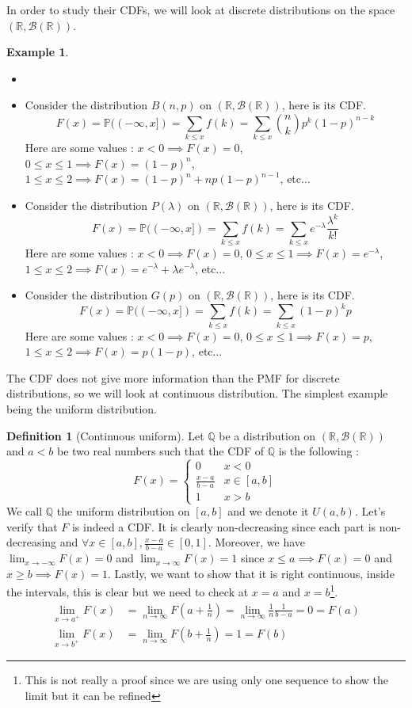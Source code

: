 \documentclass[paper=a4, fontsize=12pt]{scrartcl} %
\theoremstyle{definition}
\newtheorem{defn}[thm]{Definition}
\newtheorem{exmp}[thm]{Example}
\theoremstyle{remark}
\newcommand{\R}{\mathbb{R}}
\newcommand{\Q}{\mathbb{Q}}
\renewcommand{\P}{\mathbb{P}}
\numberwithin{equation}{section} %
\numberwithin{figure}{section} %
\numberwithin{table}{section} %
\begin{document}
In order to study their CDFs, we will look at discrete distributions on the space $(\R, \mathcal{B}(\R))$.
\begin{exmp}
	\begin{itemize}
		\item[]
		\item Consider the distribution $B(n,p)$ on $(\R, \mathcal{B}(\R))$, here is its CDF.
		\[F(x) = \P((-\infty,x]) = \sum_{k\leq x} f(k) = \sum_{k\leq x} \binom{n}{k}p^k(1-p)^{n-k}\]
		Here are some values : $x < 0 \implies F(x) = 0$, $0\leq x \leq 1 \implies F(x) = (1-p)^n$, $1 \leq x \leq 2 \implies F(x) = (1-p)^n + np(1-p)^{n-1}$, etc...
		\item Consider the distribution $P(\lambda)$ on $(\R, \mathcal{B}(\R))$, here is its CDF.
		\[ F(x) = \P((-\infty,x]) = \sum_{k\leq x}f(k) = \sum_{k\leq x} e^{-\lambda}\frac{\lambda^k}{k!}\]
		Here are some values : $x < 0 \implies F(x) = 0$, $0 \leq x \leq 1 \implies F(x) = e^{-\lambda}$, $1 \leq x \leq 2 \implies F(x) = e^{-\lambda} + \lambda e^{-\lambda}$, etc...
		\item Consider the distribution $G(p)$ on $(\R, \mathcal{B}(\R))$, here is its CDF.
		\[F(x) = \P((-\infty,x]) = \sum_{k\leq x}f(k) = \sum_{k\leq x} (1-p)^kp\]
		Here are some values : $x < 0 \implies F(x) = 0$, $0\leq x \leq 1 \implies F(x) = p$, $1 \leq x \leq 2 \implies F(x) = p(1-p)$, etc...
	\end{itemize}
\end{exmp}
The CDF does not give more information than the PMF for discrete distributions, so we will look at continuous distribution. The simplest example being the uniform distribution.
\begin{defn}[Continuous uniform]
	Let $\Q$ be a distribution on $(\R, \mathcal{B}(\R))$ and $a<b$ be two real numbers such that the CDF of $\Q$ is the following :
	\[ F(x) = \begin{cases}		0 &x<0\\ \frac{x-a}{b-a} & x \in [a,b]\\ 1 & x>b	\end{cases}\]
	We call $\Q$ the uniform distribution on $[a,b]$ and we denote it $U(a,b)$. Let's verify that $F$ is indeed a CDF. It is clearly non-decreasing since each part is non-decreasing and $\forall x \in [a,b], \frac{x-a}{b-a} \in [0,1]$. Moreover, we have $\lim_{x\rightarrow -\infty} F(x) = 0$ and $\lim_{x\rightarrow \infty} F(x) = 1$ since $x \leq a \implies F(x) = 0$ and $x \geq b \implies F(x) = 1$. Lastly, we want to show that it is right continuous, inside the intervals, this is clear but we need to check at $x = a $ and $x = b$\footnote{This is not really a proof since we are using only one sequence to show the limit but it can be refined}. 
	\begin{align*}
	\lim_{x\rightarrow a^+}F(x) &= \lim_{n\rightarrow \infty} F(a+\frac{1}{n}) = \lim_{n\rightarrow \infty} \frac{1}{n}\frac{1}{b-a} = 0 = F(a)\\
	\lim_{x\rightarrow b^+}F(x) &= \lim_{n\rightarrow \infty} F(b+\frac{1}{n}) = 1 = F(b)
	\end{align*}
\end{defn}
\end{document}
